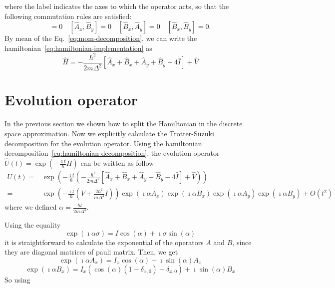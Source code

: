 where the label indicates the axes to which the operator acts, so that the following commutation rules are satisfied:
\begin{equation}
[\hat{A}_x, \hat{A}_y] = 0 \quad [\hat{A}_x, \hat{B}_y] = 0 \quad [\hat{B}_x, \hat{A}_y] = 0 \quad [\hat{B}_x, \hat{B}_y] = 0.
\end{equation} 
By mean of the Eq.~\eqref{eq:mom-decomposition}, we can write the hamiltonian~\eqref{eq:hamiltonian-implementation} as
\begin{equation} \label{eq:hamiltonian-decomposition}
\hat{H} = -\frac{\hbar^2}{2 m \Delta^2} \left[ \hat{A}_x + \hat{B}_x + \hat{A}_y + \hat{B}_y - 4 \hat{I} \right] + \hat{V}
\end{equation}

\section{Evolution operator}
In the previous section we shown how to split the Hamiltonian in the discrete space approximation. Now we explicitly calculate the Trotter-Suzuki decomposition for the evolution operator. Using the hamiltonian decomposition~\eqref{eq:hamiltonian-decomposition}, the evolution operator $\hat{U}(t) = \exp(-\frac{\imath t}{\hbar} H)$ can be written as follow 
\begin{align}
U(t) = &  \exp\left(-\frac{\imath t}{\hbar} \left( -\frac{\hbar^2}{2 m \Delta^2} \left[ \hat{A}_x + \hat{B}_x + \hat{A}_y + \hat{B}_y - 4 \hat{I} \right] + \hat{V} \right) \right) \\
= & \exp\left(-\frac{\imath t}{\hbar}\left(V + \frac{2 \hbar^2}{m \Delta^2} I\right) \right) \exp\left(\imath \alpha A_x \right) \exp\left(\imath \alpha B_x \right) \exp\left(\imath \alpha A_y \right) \exp\left(\imath \alpha B_y \right) + O(t^2)
\end{align}
where we defined $\alpha = \frac{\hbar t}{2m\Delta^2}$. 

Using the equality 
\begin{equation}
\exp(\imath \alpha \sigma) = I \cos(\alpha) + \imath \sigma \sin(\alpha)
\end{equation}
it is straightforward to calculate the exponential of the operators $A$ and $B$, since they are diagonal matrices of pauli matrix. Then, we get
\begin{equation}
\exp\left(\imath \alpha A_x \right) = I_x \cos(\alpha) + \imath \sin(\alpha) A_x
\end{equation}
\begin{equation}
\exp\left(\imath \alpha B_x \right) = I_x (\cos(\alpha)(1-\delta_{x,0}) + \delta_{x,0}) + \imath \sin(\alpha) B_x
\end{equation}
So using

